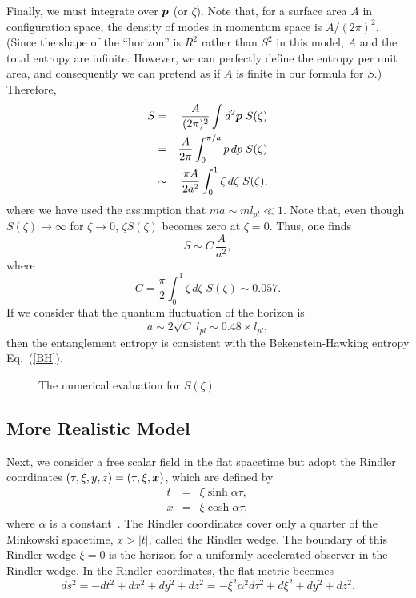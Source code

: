 \documentclass[12pt,epsf]{article}
\def\bmi#1{\mbox{\boldmath $#1$}}
\begin{document}
Finally, we must integrate over $\bmi{p}$ (or $\zeta$).
Note that, for a surface area $A$ in configuration space,
the density of modes in momentum space is $A/(2\pi)^2$.
(Since the shape of the ``horizon'' is $R^2$ rather than $S^2$
in this model, $A$ and the total entropy are infinite.
However, we can perfectly define the entropy per unit area,
and consequently we can pretend as if $A$ is finite
in our formula for $S$.)
Therefore,
\begin{eqnarray}
  S &=&\frac{A}{(2\pi)^2}\int d^2\bmi{p} \;S(\zeta) \nonumber \\
    &=&\frac{A}{2\pi}\int^{\pi/a}_0 p\,dp\; S(\zeta) \nonumber \\
    &\sim &\frac{\pi A}{2a^2 }\int^1_0 
         \zeta\, d\zeta \;S(\zeta),
\end{eqnarray}
where we have used the assumption that $ma\sim ml_{pl}\ll 1$.
Note that, even though $S(\zeta)\to\infty$ for $\zeta\to0$,
$\zeta S(\zeta)$ becomes zero at $\zeta=0$.
Thus, one finds
\begin{equation}
  S\sim C\,\frac{A}{a^2},
\end{equation}
where
\begin{equation}
  C=\frac{\pi}{2}\int^1_0 
    \zeta\, d\zeta \;S(\zeta)\sim 0.057.
\end{equation}
If we consider that the quantum fluctuation of the horizon is
\begin{equation}
  a \sim 2\sqrt{C}\; l_{pl} \sim 0.48 \times l_{pl} ,
\end{equation}
then the entanglement entropy is consistent with 
the Bekenstein-Hawking entropy Eq.~(\ref{BH}).

\begin{figure}
\begin{center}
\leavevmode
\epsfysize=7cm
\caption{The numerical evaluation for $S(\zeta)$}
\label{fig-ent}
\end{center}
\end{figure}


\subsection{More Realistic Model}
Next, we consider a free scalar field in the flat spacetime but
adopt the Rindler coordinates
$(\tau,\xi,y,z)=(\tau,\xi,\bmi{x})$, which are defined by
\begin{eqnarray}
  t&=&\xi\sinh \alpha\tau,  \nonumber \\
  x&=&\xi\cosh \alpha\tau,
\end{eqnarray}
where $\alpha$ is a constant~\cite{Rindle66}.
The Rindler coordinates cover only
a quarter of the Minkowski spacetime, $x>|t|$,
called the Rindler wedge.
The boundary of this Rindler wedge $\xi=0$ is
the horizon for a uniformly accelerated observer
in the Rindler wedge.
In the Rindler coordinates, the flat metric becomes
\begin{equation}
  ds^2=-dt^2+dx^2+dy^2+dz^2=
   -\xi^2\alpha^2 d\tau^2+d\xi^2+dy^2+dz^2.
\label{Rindler}
\end{equation}
\end{document}

